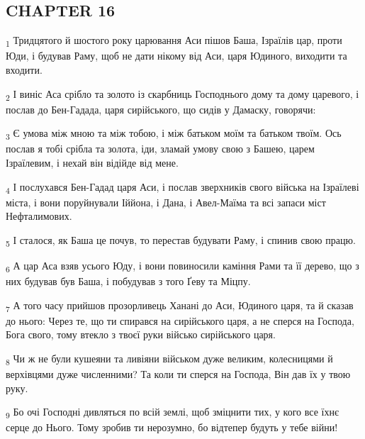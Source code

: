 \subsection{CHAPTER 16}
\begin{tcolorbox}
\textsubscript{1} Тридцятого й шостого року царювання Аси пішов Баша, Ізраїлів цар, проти Юди, і будував Раму, щоб не дати нікому від Аси, царя Юдиного, виходити та входити.
\end{tcolorbox}
\begin{tcolorbox}
\textsubscript{2} І виніс Аса срібло та золото із скарбниць Господнього дому та дому царевого, і послав до Бен-Гадада, царя сирійського, що сидів у Дамаску, говорячи:
\end{tcolorbox}
\begin{tcolorbox}
\textsubscript{3} Є умова між мною та між тобою, і між батьком моїм та батьком твоїм. Ось послав я тобі срібла та золота, іди, зламай умову свою з Башею, царем Ізраїлевим, і нехай він відійде від мене.
\end{tcolorbox}
\begin{tcolorbox}
\textsubscript{4} І послухався Бен-Гадад царя Аси, і послав зверхників свого війська на Ізраїлеві міста, і вони поруйнували Іййона, і Дана, і Авел-Маїма та всі запаси міст Нефталимових.
\end{tcolorbox}
\begin{tcolorbox}
\textsubscript{5} І сталося, як Баша це почув, то перестав будувати Раму, і спинив свою працю.
\end{tcolorbox}
\begin{tcolorbox}
\textsubscript{6} А цар Аса взяв усього Юду, і вони повиносили каміння Рами та її дерево, що з них будував був Баша, і побудував з того Ґеву та Міцпу.
\end{tcolorbox}
\begin{tcolorbox}
\textsubscript{7} А того часу прийшов прозорливець Ханані до Аси, Юдиного царя, та й сказав до нього: Через те, що ти спирався на сирійського царя, а не сперся на Господа, Бога свого, тому втекло з твоєї руки військо сирійського царя.
\end{tcolorbox}
\begin{tcolorbox}
\textsubscript{8} Чи ж не були кушеяни та ливіяни військом дуже великим, колесницями й верхівцями дуже численними? Та коли ти сперся на Господа, Він дав їх у твою руку.
\end{tcolorbox}
\begin{tcolorbox}
\textsubscript{9} Бо очі Господні дивляться по всій землі, щоб зміцнити тих, у кого все їхнє серце до Нього. Тому зробив ти нерозумно, бо відтепер будуть у тебе війни!
\end{tcolorbox}

